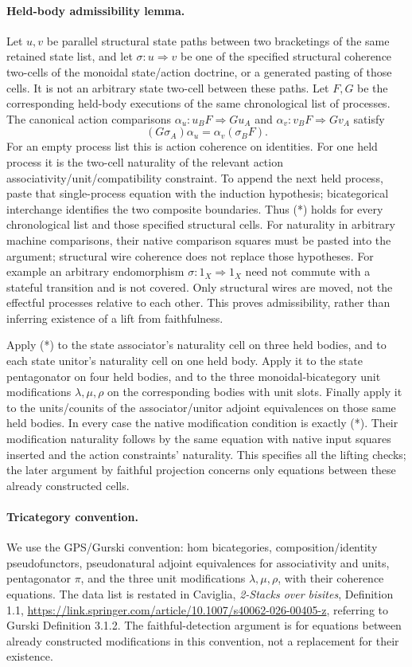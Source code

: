 \documentclass{article}
\begin{document}
\paragraph{Held-body admissibility lemma.} Let $u,v$ be parallel structural state paths between two bracketings of the same retained state list, and let $\sigma:u\Rightarrow v$ be one of the specified structural coherence two-cells of the monoidal state/action doctrine, or a generated pasting of those cells. It is not an arbitrary state two-cell between these paths. Let $F,G$ be the corresponding held-body executions of the same chronological list of processes. The canonical action comparisons $\alpha_u:u_B F\Rightarrow G u_A$ and $\alpha_v:v_B F\Rightarrow G v_A$ satisfy
\[
 (G\sigma_A)\alpha_u=\alpha_v(\sigma_B F). \tag{*}
\]
For an empty process list this is action coherence on identities. For one held process it is the two-cell naturality of the relevant action associativity/unit/compatibility constraint. To append the next held process, paste that single-process equation with the induction hypothesis; bicategorical interchange identifies the two composite boundaries. Thus (*) holds for every chronological list and those specified structural cells. For naturality in arbitrary machine comparisons, their native comparison squares must be pasted into the argument; structural wire coherence does not replace those hypotheses. For example an arbitrary endomorphism $\sigma:1_X\Rightarrow1_X$ need not commute with a stateful transition and is not covered. Only structural wires are moved, not the effectful processes relative to each other. This proves admissibility, rather than inferring existence of a lift from faithfulness.

Apply (*) to the state associator's naturality cell on three held bodies, and to each state unitor's naturality cell on one held body. Apply it to the state pentagonator on four held bodies, and to the three monoidal-bicategory unit modifications $\lambda,\mu,\rho$ on the corresponding bodies with unit slots. Finally apply it to the units/counits of the associator/unitor adjoint equivalences on those same held bodies. In every case the native modification condition is exactly (*). Their modification naturality follows by the same equation with native input squares inserted and the action constraints' naturality. This specifies all the lifting checks; the later argument by faithful projection concerns only equations between these already constructed cells.

\paragraph{Tricategory convention.} We use the GPS/Gurski convention: hom bicategories, composition/identity pseudofunctors, pseudonatural adjoint equivalences for associativity and units, pentagonator $\pi$, and the three unit modifications $\lambda,\mu,\rho$, with their coherence equations. The data list is restated in Caviglia, \emph{2-Stacks over bisites}, Definition 1.1, \url{https://link.springer.com/article/10.1007/s40062-026-00405-z}, referring to Gurski Definition 3.1.2. The faithful-detection argument is for equations between already constructed modifications in this convention, not a replacement for their existence.
\end{document}

